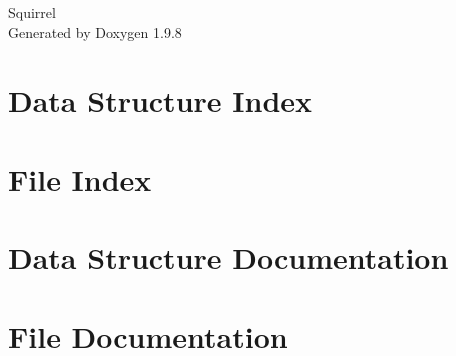 \documentclass[twoside]{book}
\newcommand{\+}{\discretionary{\mbox{\scriptsize$\hookleftarrow$}}{}{}}
\newcommand{\clearemptydoublepage}{%
    \newpage{\pagestyle{empty}\cleardoublepage}%
  }
\begin{document}
  \raggedbottom
    \hypersetup{pageanchor=false,
                bookmarksnumbered=true,
                pdfencoding=unicode
               }
  \begin{titlepage}
  \vspace*{7cm}
  \begin{center}%
  {\Large Squirrel}\\
  \vspace*{1cm}
  {\large Generated by Doxygen 1.9.8}\\
  \end{center}
  \end{titlepage}
  \clearemptydoublepage
  \tableofcontents
  \clearemptydoublepage
  \hypersetup{pageanchor=true}
\chapter{Data Structure Index}

\chapter{File Index}

\chapter{Data Structure Documentation}

\chapter{File Documentation}


  \backmatter
  \newpage
  \clearemptydoublepage
  \printindex
\end{document}
